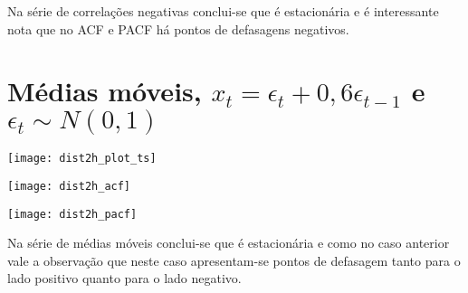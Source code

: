 Na série de correlações negativas     conclui-se que é estacionária e é interessante nota que no ACF e PACF há pontos de defasagens negativos.

\section{Médias móveis, $x_{t}=\epsilon_{t}+0,6\epsilon_{t-1}$ e $\epsilon_{t}\sim N(0,1)$}

\begin{center}
\begin{centering}
\texttt{[image: dist2h\_plot\_ts]}
\par\end{centering}
\par\end{center}

\begin{center}
\begin{centering}
\texttt{[image: dist2h\_acf]}
\par\end{centering}
\par\end{center}

\begin{center}
\begin{centering}
\texttt{[image: dist2h\_pacf]}
\par\end{centering}
\par\end{center}

Na série de médias móveis conclui-se que é estacionária e como no caso anterior vale a observação que neste caso apresentam-se pontos de defasagem tanto para o lado positivo quanto para o lado negativo.

